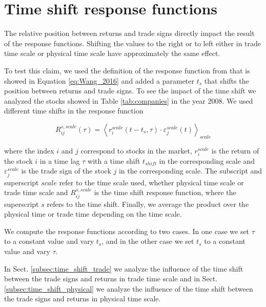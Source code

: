 \section{Time shift response functions}\label{sec:time_shift}

The relative position between returns and trade signs directly impact the
result of the response functions. Shifting the values to the right or to left
either in trade time scale or physical time scale have approximately the same
effect.

To test this claim, we used the definition of the response function from
\cite{Wang_2016_cross} that is showed in Equation \ref{eq:Wang_2016} and added
a parameter $t_{s}$ that shifts the position between returns and trade signs.
To see the impact of the time shift we analyzed the stocks showed in Table
\ref{tab:companies} in the year 2008. We used different time shifts in the
response function

\begin{equation}\label{eq:time_shift_general}
    R_{ij}^{s, scale}\left(\tau\right)=\left\langle r^{scale}_{i}
    \left(t-t_{s},\tau\right) \cdot\varepsilon^{scale}_{j}
    \left(t\right)\right\rangle _{scale}
\end{equation}

where the index $i$ and $j$ correspond to stocks in the market, $r^{scale}_{i}$
is the return of the stock $i$ in a time lag $\tau$ with a time shift
$t_{shift}$ in the corresponding scale and $\varepsilon^{scale}_{j}$ is the
trade sign of the stock $j$ in the corresponding scale. The subscript and
superscript $scale$ refer to the time scale used, whether physical time scale or
trade time scale and $R_{ij}^{s,scale}$ is the time shift response function,
where the superscript $s$ refers to the time shift. Finally, we average the
product over the physical time or trade time depending on the time scale.

We compute the response functions according to two cases. In one case we set
$\tau$ to a constant value and vary $t_{s}$, and in the other case we set
$t_{s}$ to a constant value and vary $\tau$.

In Sect. \ref{subsec:time_shift_trade} we analyze the influence of the time
shift between the trade signs and returns in trade time scale and in Sect.
\ref{subsec:time_shift_physical} we analyze the influence of the time shift
between the trade signs and returns in physical time scale.

